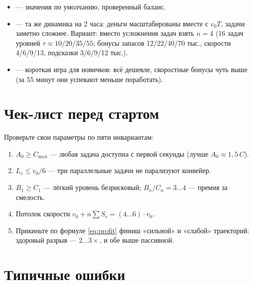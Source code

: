 \documentclass[12pt,a4paper]{article}
\newcommand{\A}{A_0}
\newcommand{\vv}{v_0}
\begin{document}
\begin{itemize}[itemsep=2pt]
\item {} --- значения по умолчанию, проверенный баланс.
\item {} --- та же динамика на 2 часа: деньги
масштабированы вместе с $\vv T$, задачи заметно сложнее. Вариант:
вместо усложнения задач взять $n=4$ (16 задач уровней
$\tau \approx 10/20/35/55$; бонусы запасов 12/22/40/70 тыс.,
скорости 4/6/9/13, подсказки 3/6/9/12 тыс.).
\item {} --- короткая игра для новичков: всё дешевле,
скоростные бонусы чуть выше (за 55 минут они успевают меньше поработать).
\end{itemize}

\section{Чек-лист перед стартом}

Проверьте свои параметры по пяти инвариантам:

\begin{enumerate}[leftmargin=1.6em,itemsep=2pt]
\item $\A \ge C_{\max}$ --- любая задача доступна с первой секунды
(лучше $\A \approx 1{,}5\,C$).
\item $L_r \le \vv/6$ --- три параллельные задачи не парализуют конвейер.
\item $B_1 \ge C_1$ --- лёгкий уровень безрисковый; $B_n/C_n = 3\dots4$ ---
премия за смелость.
\item Потолок скорости $\vv + n\sum S_r = (4\dots6)\cdot \vv$.
\item Прикиньте по формуле \eqref{eq:profit} финиш «сильной» и «слабой»
траекторий: здоровый разрыв --- $2\dots3\times$, и обе выше пассивной.
\end{enumerate}

\section{Типичные ошибки}
\end{document}
